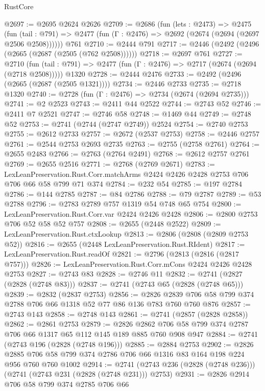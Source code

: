 \begin{lexlean}{RustCore}
\begin{coremodule}
@2697 := @2695 @2624 @2626
@2709 := @2686
    (fun (lets : @2473) =>
    @2475
      (fun (tail : @791) => @2477 (fun (Γ : @2476) => @2692 (@2674 (@2694 (@2697 @2506 @2508))))))
    @761
@2710 := @2444 @791
@2717 := @2446 (@2492 (@2496 (@2665 (@2687 (@2505 (@762 @2508))))))
@2718 := @2697 @761
@2727 := @2710
    (fun (tail : @791) => @2477 (fun (Γ : @2476) => @2717 (@2674 (@2694 (@2718 @2508)))))
    @1320
@2728 := @2444 @2476
@2733 := @2492 (@2496 (@2665 (@2687 (@2505 @1321))))
@2734 := @2446 @2733
@2735 := @2718 @1320
@2740 := @2728 (fun (Γ : @2476) => @2734 (@2674 (@2694 @2735)))
@2741 := @2 @2523
@2743 := @2411 @44 @2522
@2744 := @2743 @52
@2746 := @2411 @7 @2521
@2747 := @2746 @58
@2748 := @1469 @44
@2749 := @2748 @52
@2753 := @2741 (@2744 (@2747 @2749)) @2524
@2754 := @2740 @2753
@2755 := @2612 @2733
@2757 := @2672 (@2537 @2753)
@2758 := @2446 @2757
@2761 := @2544 @2753 @2693 @2735
@2763 := @2755 (@2758 @2761)
@2764 := @2655 @2483
@2766 := @2763 (@2764 @2491)
@2768 := @2612 @2757 @2761
@2769 := @2655 @2516
@2771 := @2768 (@2769 @2671)
@2783 := LexLeanPreservation.Rust.Corr.matchArms
    @2424
    @2426
    @2428
    @2753
    @706
    @706
    @66
    @58
    @799
    @71
    @374
@2784 := @232 @54
@2785 := @197 @2784
@2786 := @144 @2785
@2787 := @84 @2786
@2788 := @79 @2787
@2789 := @53 @2788
@2796 := @2783 @2789 @757 @1319 @54 @748 @65 @754
@2800 := LexLeanPreservation.Rust.Corr.var @2424 @2426 @2428
@2806 := @2800 @2753 @706 @52 @58 @52 @757
@2808 := @2655 (@2448 @2522)
@2809 := LexLeanPreservation.Rust.ctxLookup
@2813 := @2806 (@2808 (@2809 @2753 @52))
@2816 := @2655 (@2448 LexLeanPreservation.Rust.RIdent)
@2817 := LexLeanPreservation.Rust.readOf
@2821 := @2796 (@2813 (@2816 (@2817 @757)))
@2826 := LexLeanPreservation.Rust.Corr.mCons @2424 @2426 @2428 @2753
@2827 := @2743 @83
@2828 := @2746 @11
@2832 := @2741 (@2827 (@2828 (@2748 @83)))
@2837 := @2741 (@2743 @65 (@2828 (@2748 @65)))
@2839 := @2832 (@2837 @2753)
@2856 := @2826 @2839 @706 @58 @799 @374 @2788 @706 @66 @1318 @52 @77 @86 @136 @783 @760 @760 @876
@2857 := @2743 @143
@2858 := @2748 @143
@2861 := @2741 (@2857 (@2828 @2858))
@2862 := @2861 @2753
@2879 := @2826 @2862 @706 @58 @799 @374 @2787 @706 @66 @1317 @65 @112 @145 @189 @885 @760 @908 @947
@2884 := @2741 (@2743 @196 (@2828 (@2748 @196)))
@2885 := @2884 @2753
@2902 := @2826 @2885 @706 @58 @799 @374 @2786 @706 @66 @1316 @83 @164 @198 @224 @956 @760 @760 @1002
@2914 := @2741 (@2743 @236 (@2828 (@2748 @236))) (@2741 (@2743 @231 (@2828 (@2748 @231))) @2753)
@2931 := @2826
    @2914
    @706
    @58
    @799
    @374
    @2785
    @706
    @66

\end{coremodule}
\end{lexlean}
